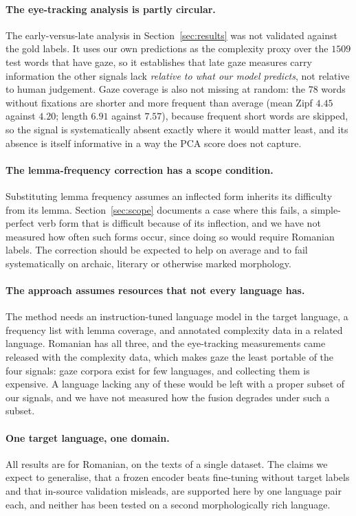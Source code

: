 \paragraph{The eye-tracking analysis is partly circular.}
The early-versus-late analysis in Section~\ref{sec:results} was not
validated against the gold labels. It uses our own predictions as the
complexity proxy over the $1509$ test words that have gaze, so it
establishes that late gaze measures carry information the other signals
lack \emph{relative to what our model predicts}, not relative to human
judgement. Gaze coverage is also not missing at random: the $78$ words
without fixations are shorter and more frequent than average (mean Zipf
$4.45$ against $4.20$; length $6.91$ against $7.57$), because frequent
short words are skipped, so the signal is systematically absent exactly
where it would matter least, and its absence is itself informative in a
way the PCA score does not capture.

\paragraph{The lemma-frequency correction has a scope condition.}
Substituting lemma frequency assumes an inflected form inherits its
difficulty from its lemma. Section~\ref{sec:scope} documents a case
where this fails, a simple-perfect verb form that is difficult because
of its inflection, and we have not measured how often such forms occur,
since doing so would require Romanian labels. The correction should be
expected to help on average and to fail systematically on archaic,
literary or otherwise marked morphology.

\paragraph{The approach assumes resources that not every language has.}
The method needs an instruction-tuned language model in the target
language, a frequency list with lemma coverage, and annotated complexity
data in a related language. Romanian has all three, and the eye-tracking
measurements came released with the complexity data, which makes gaze
the least portable of the four signals: gaze corpora exist for few
languages, and collecting them is expensive. A language lacking any of
these would be left with a proper subset of our signals, and we have not
measured how the fusion degrades under such a subset.

\paragraph{One target language, one domain.}
All results are for Romanian, on the texts of a single dataset. The
claims we expect to generalise, that a frozen encoder beats fine-tuning
without target labels and that in-source validation misleads, are
supported here by one language pair each, and neither has been tested on
a second morphologically rich language.

